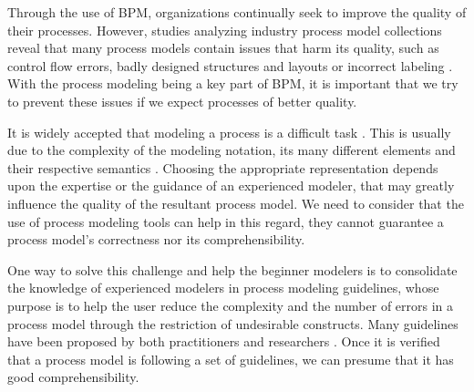\documentclass[a4paper,twoside]{article}
\begin{document}
Through the use of BPM, organizations continually seek to improve the quality of their processes. However, studies analyzing industry process model collections reveal that many process models contain issues that harm its quality, such as control flow errors, badly designed structures and layouts or incorrect labeling \cite{Mendling2008a} \cite{Leopold2016}. With the process modeling being a key part of BPM, it is important that we try to prevent these issues if we expect processes of better quality.


It is widely accepted that modeling a process is a difficult task \cite{Mendling2010}. This is usually due to the complexity of the modeling notation, its many different elements and their respective semantics \cite{Leopold2016}. Choosing the appropriate representation depends upon the expertise or the guidance of an experienced modeler, that may greatly influence the quality of the resultant process model. We need to consider that the use of process modeling tools can help in this regard, they cannot guarantee a process model's correctness nor its comprehensibility.



One way to solve this challenge and help the beginner modelers is to consolidate the knowledge of experienced modelers in process modeling guidelines, whose purpose is to help the user reduce the complexity and the number of errors in a process model through the restriction of undesirable constructs. Many guidelines have been proposed by both practitioners \cite{Silver2009} \cite{White2008} \cite{Allweyer2010} and researchers \cite{Becker2000} \cite{Mendling2007} \cite{Vanderfeesten2008} \cite{Correia2012}. Once it is verified that a process model is following a set of guidelines, we can presume that it has good comprehensibility.
\end{document}
